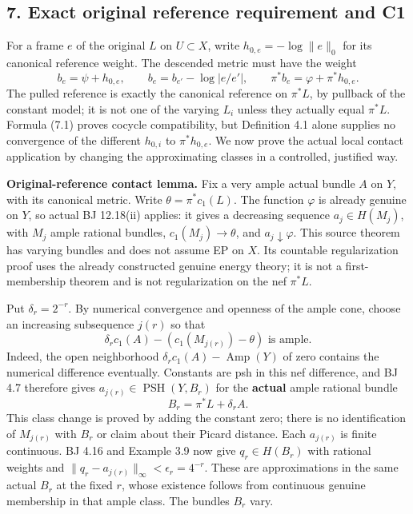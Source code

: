 \documentclass[
  10pt,
]{article}
\begin{document}
\subsection{7. Exact original reference requirement and
C1}\label{exact-original-reference-requirement-and-c1}

For a frame \(e\) of the original \(L\) on \(U\subset X\), write
\(h_{0,e}=-\log\|e\|_0\) for its canonical reference weight. The
descended metric must have the weight \[b_e=\psi+h_{0,e},\qquad
b_e=b_{e'}-\log|e/e'|,\qquad
\pi^*b_e=\varphi+\pi^*h_{0,e}.                                        \tag{7.1}\]
The pulled reference is exactly the canonical reference on \(\pi^*L\),
by pullback of the constant model; it is not one of the varying \(L_i\)
unless they actually equal \(\pi^*L\). Formula (7.1) proves cocycle
compatibility, but Definition 4.1 alone supplies no convergence of the
different \(h_{0,i}\) to \(\pi^*h_{0,e}\). We now prove the actual local
contact application by changing the approximating classes in a
controlled, justified way.

\textbf{Original-reference contact lemma.} Fix a very ample actual
bundle \(A\) on \(Y\), with its canonical metric. Write
\(\theta=\pi^*c_1(L)\). The function \(\varphi\) is already genuine on
\(Y\), so actual BJ 12.18(ii) applies: it gives a decreasing sequence
\(a_j\in H(M_j)\), with \(M_j\) ample rational bundles,
\(c_1(M_j)\to\theta\), and \(a_j\downarrow\varphi\). This source theorem
has varying bundles and does not assume EP on \(X\). Its countable
regularization proof uses the already constructed genuine energy theory;
it is not a first-membership theorem and is not regularization on the
nef \(\pi^*L\).

Put \(\delta_r=2^{-r}\). By numerical convergence and openness of the
ample cone, choose an increasing subsequence \(j(r)\) so that
\[\delta_r c_1(A)-(c_1(M_{j(r)})-\theta)\text{ is ample}.                 \tag{7.2}\]
Indeed, the open neighborhood \(\delta_r c_1(A)-\operatorname{Amp}(Y)\)
of zero contains the numerical difference eventually. Constants are psh
in this nef difference, and BJ 4.7 therefore gives
\(a_{j(r)}\in\operatorname{PSH}(Y,B_r)\) for the \textbf{actual} ample
rational bundle \[B_r=\pi^*L+\delta_r A.\] This class change is proved
by adding the constant zero; there is no identification of \(M_{j(r)}\)
with \(B_r\) or claim about their Picard distance. Each \(a_{j(r)}\) is
finite continuous. BJ 4.16 and Example 3.9 now give \(q_r\in H(B_r)\)
with rational weights and \(\|q_r-a_{j(r)}\|_\infty<\epsilon_r=4^{-r}\).
These are approximations in the same actual \(B_r\) at the fixed \(r\),
whose existence follows from continuous genuine membership in that ample
class. The bundles \(B_r\) vary.
\end{document}
